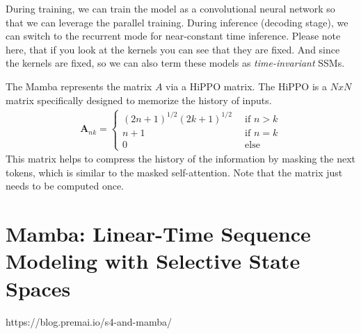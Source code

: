 During training, we can train the model as a convolutional neural network so that we can leverage the parallel training. During inference (\ie decoding stage), we can switch to the recurrent mode for near-constant time inference. Please note here, that if you look at the kernels you can see that they are fixed. And since the kernels are fixed, so we can also term these models as \textit{time-invariant} SSMs. 

The Mamba represents the matrix $A$ via a HiPPO matrix. The HiPPO is a $N x N$ matrix specifically designed to memorize the history of inputs. 
\begin{align*}
	\mathbf{A}_{nk} = 
\begin{cases}
	(2n+1)^{1/2}(2k+1)^{1/2}\, &\textrm{ if } n>k\\
	n+1\, &\textrm{ if } n=k\\
	0\, &\textrm{ else }
\end{cases}
\end{align*}
This matrix helps to compress the history of the information by masking the next tokens, which is similar to the masked self-attention. Note that the matrix just needs to be computed once. 


\section{Mamba: Linear-Time Sequence Modeling with Selective State Spaces}
\label{sec:ssm_mamba}
https://blog.premai.io/s4-and-mamba/


